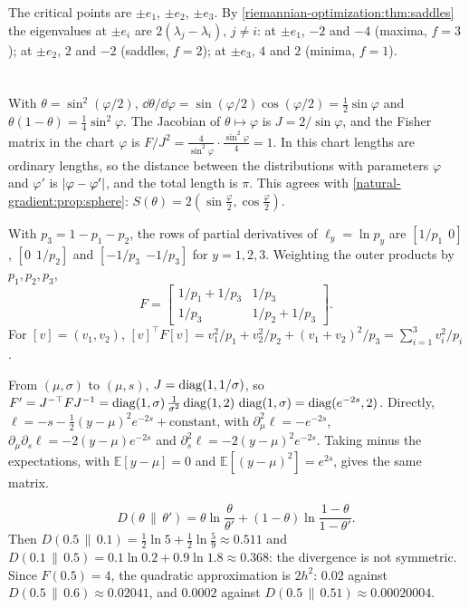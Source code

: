 The critical points are $\pm e_1$, $\pm e_2$, $\pm e_3$. By
\cref{riemannian-optimization:thm:saddles} the eigenvalues at $\pm e_i$
are $2(\lambda_j - \lambda_i)$, $j\neq i$: at $\pm e_1$, $-2$ and $-4$
(maxima, $f = 3$); at $\pm e_2$, $2$ and $-2$ (saddles, $f = 2$); at
$\pm e_3$, $4$ and $2$ (minima, $f = 1$).

\section{}

With $\theta = \sin^2(\varphi/2)$,
$\dd\theta/\dd\varphi = \sin(\varphi/2)\cos(\varphi/2)
= \frac12\sin\varphi$ and
$\theta(1 - \theta) = \frac14\sin^2\varphi$. The Jacobian of
$\theta\mapsto\varphi$ is $J = 2/\sin\varphi$, and the Fisher matrix in
the chart $\varphi$ is $F/J^2
= \frac4{\sin^2\varphi}\cdot\frac{\sin^2\varphi}4 = 1$. In this chart
lengths are ordinary lengths, so the distance between the distributions
with parameters $\varphi$ and $\varphi'$ is $\left|\varphi - \varphi'\right|$,
and the total length is $\pi$. This agrees with
\cref{natural-gradient:prop:sphere}:
$S(\theta) = 2(\sin\frac\varphi2, \cos\frac\varphi2)$.

With $p_3 = 1 - p_1 - p_2$, the rows of partial derivatives of
$\ell_y = \ln p_y$ are $[1/p_1\ \ 0]$, $[0\ \ 1/p_2]$ and
$[-1/p_3\ \ {-1/p_3}]$ for $y = 1, 2, 3$. Weighting the outer products by
$p_1, p_2, p_3$,
\[
  F = \begin{bmatrix}
    1/p_1 + 1/p_3 & 1/p_3\\ 1/p_3 & 1/p_2 + 1/p_3
  \end{bmatrix} .
\]
For $[v] = (v_1, v_2)$,
$[v]^\top F[v] = v_1^2/p_1 + v_2^2/p_2 + (v_1 + v_2)^2/p_3
= \sum_{i=1}^3v_i^2/p_i$.

From $(\mu, \sigma)$ to $(\mu, s)$, $J = \operatorname{diag}(1, 1/\sigma)$, so
$F' = J^{-\top}FJ^{-1}
= \operatorname{diag}(1, \sigma)\,\frac1{\sigma^2}\operatorname{diag}(1, 2)\,\operatorname{diag}(1, \sigma)
= \operatorname{diag}(e^{-2s}, 2)$. Directly,
$\ell = -s - \frac12(y - \mu)^2e^{-2s} + \text{constant}$, with
$\partial_\mu^2\ell = -e^{-2s}$,
$\partial_\mu\partial_s\ell = -2(y - \mu)e^{-2s}$ and
$\partial_s^2\ell = -2(y - \mu)^2e^{-2s}$. Taking minus the expectations,
with $\mathbb E[y - \mu] = 0$ and $\mathbb E[(y - \mu)^2] = e^{2s}$,
gives the same matrix.

\[
  D(\theta\,\|\,\theta') = \theta\ln\frac\theta{\theta'}
  + (1 - \theta)\ln\frac{1 - \theta}{1 - \theta'} .
\]
Then $D(0.5\,\|\,0.1) = \frac12\ln5 + \frac12\ln\frac59\approx0.511$
and $D(0.1\,\|\,0.5) = 0.1\ln0.2 + 0.9\ln1.8\approx0.368$: the
divergence is not symmetric. Since $F(0.5) = 4$, the quadratic approximation is
$2h^2$: $0.02$ against $D(0.5\,\|\,0.6)\approx0.02041$, and $0.0002$
against $D(0.5\,\|\,0.51)\approx0.00020004$.

